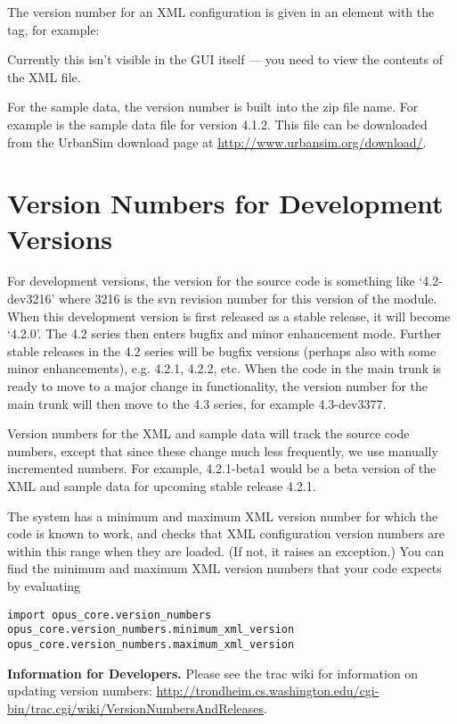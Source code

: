 The version number for an XML configuration is given in an element with the
 tag, for example:


Currently this isn't visible in the GUI itself --- you need to view the
contents of the XML file.

For the sample data, the version number is built into the zip file name.
For example  is the sample data file for version
4.1.2.  This file can be downloaded from the UrbanSim download page at
\url{http://www.urbansim.org/download/}.

\section{Version Numbers for Development Versions}

For development versions, the version for the source code is something like
`4.2-dev3216' where 3216 is the svn revision number for this version of the
module. When this development version is first released as a stable
release, it will become `4.2.0'. The 4.2 series then enters bugfix and
minor enhancement mode.  Further stable releases in the 4.2 series will be
bugfix versions (perhaps also with some minor enhancements), e.g. 4.2.1,
4.2.2, etc.  When the code in the main trunk is ready to move to a major
change in functionality, the version number for the main trunk will then
move to the 4.3 series, for example 4.3-dev3377.

Version numbers for the XML and sample data will track the source code
numbers, except that since these change much less frequently, we use
manually incremented numbers.  For example, 4.2.1-beta1 would be a beta
version of the XML and sample data for upcoming stable release 4.2.1.

The system has a minimum and maximum XML version number for which the code
is known to work, and checks that XML configuration version numbers are
within this range when they are loaded.  (If not, it raises an exception.)
You can find the minimum and maximum XML version numbers that your code
expects by evaluating
\begin{verbatim}
import opus_core.version_numbers
opus_core.version_numbers.minimum_xml_version
opus_core.version_numbers.maximum_xml_version
\end{verbatim}

{\bf Information for Developers.}  Please see the trac wiki for information
on updating version numbers:
\url{http://trondheim.cs.washington.edu/cgi-bin/trac.cgi/wiki/VersionNumbersAndReleases}.

